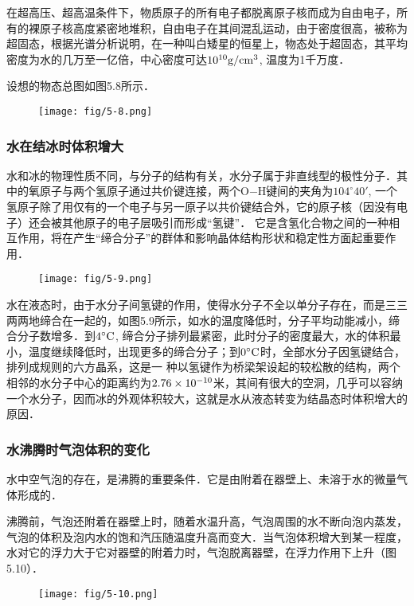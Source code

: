 在超高压、超高温条件下，物质原子的所有电子都脱离原子核而成为自由电子，所有的裸原子核高度紧密地堆积，自由电子在其间混乱运动，由于密度很高，被称为超固态，根据光谱分析说明，在一种叫白矮星的恒星上，物态处于超固态，其平均密度为水的几万至一亿倍，中心密度可达$10^{10}{\rm g/cm^3}$, 温度为1千万度．

设想的物态总图如图5.8所示．
\begin{figure}[htp]
  \centering
  \texttt{[image: fig/5-8.png]}
  \caption{}
\end{figure}

\subsubsection{水在结冰时体积增大}

水和冰的物理性质不同，与分子的结构有关，水分子属于非直线型的极性分子．其中的氧原子与两个氢原子通过共价键连接，两个O$-$H键间的夹角为$104^{\circ}40'$, 一个氢原子除了用仅有的一个电子与另一原子以共价键结合外，它的原子核（因没有电子）还会被其他原子的电子层吸引而形成“氢键”． 它是含氢化合物之间的一种相互作用，将在产生“缔合分子”的群体和影响晶体结构形状和稳定性方面起重要作用．
\begin{figure}[htp]
  \centering
  \texttt{[image: fig/5-9.png]}
  \caption{}
\end{figure}

水在液态时，由于水分子间氢键的作用，使得水分子不全以单分子存在，而是三三两两地缔合在一起的，如图5.9所示，如水的温度降低时，分子平均动能减小，缔合分子数增多．到$4^{\circ}{\rm C}$, 缔合分子排列最紧密，此时分子的密度最大，水的体积最小，温度继续降低时，出现更多的缔合分子；到$0^{\circ}{\rm C}$时，全部水分子因氢键结合，排列成规则的六方晶系，这是一
种以氢键作为桥梁架设起的较松散的结构，两个相邻的水分子中心的距离约为$2. 76\times10^{-10}$米，其间有很大的空洞，几乎可以容纳一个水分子，因而冰的外观体积较大，这就是水从液态转变为结晶态时体积增大的原因．


\subsubsection{水沸腾时气泡体积的变化}

水中空气泡的存在，是沸腾的重要条件．它是由附着在器壁上、未溶于水的微量气体形成的．

沸腾前，气泡还附着在器壁上时，随着水温升高，气泡周围的水不断向泡内蒸发，气泡的体积及泡内水的饱和汽压随温度升高而变大．当气泡体积增大到某一程度，水对它的浮力大于它对器壁的附着力时，气泡脱离器壁，在浮力作用下上升（图5.10）．
\begin{figure}[htp]
  \centering
  \texttt{[image: fig/5-10.png]}
  \caption{}
\end{figure}

